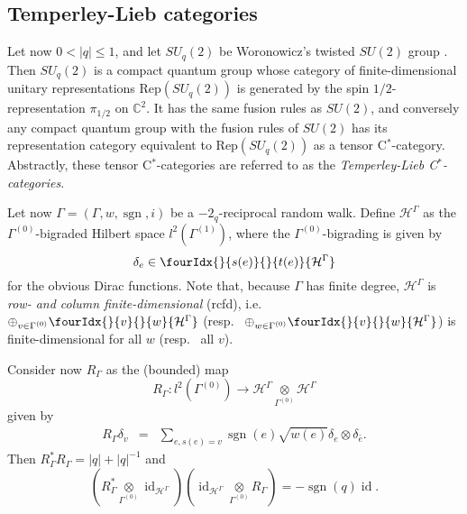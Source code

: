 \documentclass[10pt]{article}
\DeclareMathOperator{\id}{id}
\DeclareMathOperator{\sgn}{\mathrm{sgn}}
\newcommand{\C}{\mathbb{C}}
\newcommand{\Hsp}{\mathcal{H}}
\newcommand{\Rep}{\mathrm{Rep}}
\newcommand{\Gr}[5]{\fourIdx{#2}{#4}{#3}{#5}{#1}}%
\newcommand{\Gru}[3]{\Gr{#1}{}{}{#2}{#3}}
\theoremstyle{definition}
\numberwithin{equation}{section}
\begin{document}
\subsection{Temperley-Lieb categories}

Let now $0<|q|\leq 1$, and let $SU_q(2)$ be Woronowicz's twisted $SU(2)$ group \cite{Wor1}. Then $SU_q(2)$ is a compact quantum group whose category of finite-dimensional unitary representations $\Rep(SU_q(2))$ is generated by the spin $1/2$-representation $\pi_{1/2}$ on $\C^2$. It has the same fusion rules as $SU(2)$, and conversely any compact quantum group with the fusion rules of $SU(2)$ has its representation category equivalent to $\Rep(SU_q(2))$ as a tensor C$^*$-category. Abstractly, these tensor C$^*$-categories are referred to as the \emph{Temperley-Lieb C$^*$-categories}.

Let now $\Gamma = (\Gamma,w,\sgn,i)$ be a $-2_q$-reciprocal random walk. Define $\Hsp^{\Gamma}$ as the $\Gamma^{(0)}$-bigraded Hilbert space $l^2(\Gamma^{(1)})$, where the $\Gamma^{(0)}$-bigrading is given by \[\delta_e \in \Gru{\Hsp^{\Gamma}}{s(e)}{t(e)}\] for the obvious Dirac functions. Note that, because $\Gamma$ has finite degree, $\Hsp^{\Gamma}$ is \emph{row- and column finite-dimensional} (rcfd), i.e.~ $\oplus_{v\in \Gamma^{(0)}} \Gru{\Hsp^{\Gamma}}{v}{w}$ (resp.~ $\oplus_{w\in \Gamma^{(0)}} \Gru{\Hsp^{\Gamma}}{v}{w}$) is finite-dimensional for all $w$ (resp.~ all $v$). 

Consider now $R_{\Gamma}$ as the (bounded) map \[R_{\Gamma}:l^2(\Gamma^{(0)})\rightarrow \Hsp^{\Gamma}\underset{\Gamma^{(0)}}{\otimes} \Hsp^{\Gamma}\] given by \begin{eqnarray*} R_{\Gamma} \delta_v &=& \sum_{e,s(e) = v} \sgn(e)\sqrt{w(e)}\delta_e \otimes \delta_{\bar{e}}.\end{eqnarray*} Then $R_{\Gamma}^*R_{\Gamma} = |q|+|q|^{-1}$ and \[(R_{\Gamma}^*\underset{\Gamma^{(0)}}{\otimes} \id_{\Hsp^{\Gamma}})(\id_{\Hsp^{\Gamma}}\underset{\Gamma^{(0)}}{\otimes} R_{\Gamma}) = -\sgn(q)\id.\]



\end{document}
